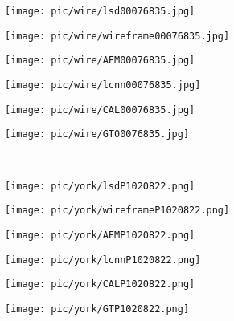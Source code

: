 \documentclass[runningheads]{llncs}
\begin{document}
\begin{figure}[H]
\begin{center}
     \begin{subfigure}[b]{0.15\textwidth}
         \centering
         \texttt{[image: pic/wire/lsd00076835.jpg]}
     \end{subfigure}
    \begin{subfigure}[b]{0.15\textwidth}
         \centering
         \texttt{[image: pic/wire/wireframe00076835.jpg]}
     \end{subfigure}
     \begin{subfigure}[b]{0.15\textwidth}
         \centering
         \texttt{[image: pic/wire/AFM00076835.jpg]}
     \end{subfigure}
     \begin{subfigure}[b]{0.15\textwidth}
         \centering
         \texttt{[image: pic/wire/lcnn00076835.jpg]}
     \end{subfigure}
     \begin{subfigure}[b]{0.15\textwidth}
         \centering
         \texttt{[image: pic/wire/CAL00076835.jpg]}
     \end{subfigure}
     \begin{subfigure}[b]{0.15\textwidth}
         \centering
         \texttt{[image: pic/wire/GT00076835.jpg]}
     \end{subfigure}
     ~~
     
     \begin{subfigure}[b]{0.15\textwidth}
         \centering
         \texttt{[image: pic/york/lsdP1020822.png]}
     \end{subfigure}
    \begin{subfigure}[b]{0.15\textwidth}
         \centering
         \texttt{[image: pic/york/wireframeP1020822.png]}
     \end{subfigure}
     \begin{subfigure}[b]{0.15\textwidth}
         \centering
         \texttt{[image: pic/york/AFMP1020822.png]}
     \end{subfigure}
     \begin{subfigure}[b]{0.15\textwidth}
         \centering
         \texttt{[image: pic/york/lcnnP1020822.png]}
     \end{subfigure}
     \begin{subfigure}[b]{0.15\textwidth}
         \centering
         \texttt{[image: pic/york/CALP1020822.png]}
     \end{subfigure}
     \begin{subfigure}[b]{0.15\textwidth}
         \centering
         \texttt{[image: pic/york/GTP1020822.png]}
     \end{subfigure}
     ~~
     

\end{center}
\end{figure}
\end{document}

